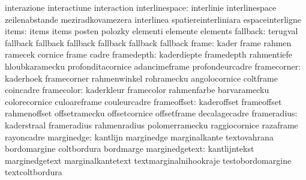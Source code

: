                            interazione               interactiune
                           interaction
           interlinespace: interlinie                interlinespace
                           zeilenabstande            meziradkovamezera
                           interlinea                spatiereinterliniara
                           espaceinterligne
                    items: items                     items
                           posten                    polozky
                           elementi                  elemente
                           elements
                 fallback: terugval                  fallback
                           fallback                  fallback
                           fallback                  fallback
                           fallback
                    frame: kader                     frame
                           rahmen                    ramecek
                           cornice                   frame
                           cadre
               framedepth: kaderdiepte               framedepth
                           rahmentiefe               hloubkaramecku
                           profonditacornice         adancimeframe
                           profondeurcadre
              framecorner: kaderhoek                 framecorner
                           rahmenwinkel              rohramecku
                           angolocornice             coltframe
                           coincadre
               framecolor: kaderkleur                framecolor
                           rahmenfarbe               barvaramecku
                           colorecornice             culoareframe
                           couleurcadre
              frameoffset: kaderoffset               frameoffset
                           rahmenoffset              offsetramecku
                           offsetcornice             offsetframe
                           decalagecadre
              frameradius: kaderstraal               frameradius
                           rahmenradius              polomerramecku
                           raggiocornice             razaframe
                           rayoncadre
               marginedge: kantlijn                  marginedge
                           marginalkante             textovahrana
                           bordomargine              coltbordura
                           bordmarge
           marginedgetext: kantlijntekst             marginedgetext
                           marginalkantetext         textmarginalnihookraje
                           testobordomargine         textcoltbordura
